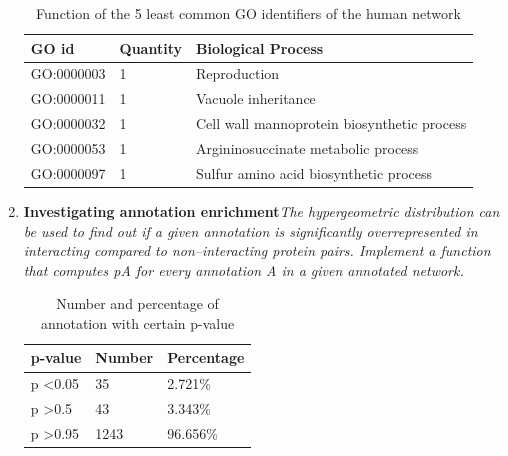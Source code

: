 \documentclass[10pt,a4paper]{article}
\begin{document}
\begin{enumerate}
	
	
	\begin{table}[H]
		\centering
		\caption{Function of the 5 least common GO identifiers of the human network}
		\vspace*{1mm}
		\label{my-label}
		\begin{tabular}{|l|l|l|}
			\hline
			\textbf{GO id} & \textbf{Quantity} & \textbf{Biological Process}                 \\ \hline
			GO:0000003     & 1                 & Reproduction                                \\ \hline
			GO:0000011     & 1                 & Vacuole inheritance                         \\ \hline
			GO:0000032     & 1                 & Cell wall mannoprotein biosynthetic process \\ \hline
			GO:0000053     & 1                 & Argininosuccinate metabolic process         \\ \hline
			GO:0000097     & 1                 & Sulfur amino acid biosynthetic process      \\ \hline
		\end{tabular}
	\end{table}

	
	\newpage
	\item \textbf{Investigating annotation enrichment}\textit{The hypergeometric distribution can be used to
		find out if a given annotation is significantly overrepresented in interacting compared to
		non–interacting protein pairs. Implement a function that computes pA for every annotation A in a given annotated network.}
	
	
	\begin{table}[H]
		\centering
		\caption{Number and percentage of annotation with certain p-value}
		\vspace*{1mm}
		\label{my-penis}
		\begin{tabular}{|l|l|l|}
			\hline
		p-value	& Number & Percentage \\ \hline
			p \textless 0.05    &   35     &     2.721\%       \\ \hline
			p \textgreater 0.5  &   43     &     3.343\%       \\ \hline
			p \textgreater 0.95 &   1243     &   96.656\%         \\ \hline
		\end{tabular}
	\end{table}

	
	

\end{enumerate}
\end{document}
